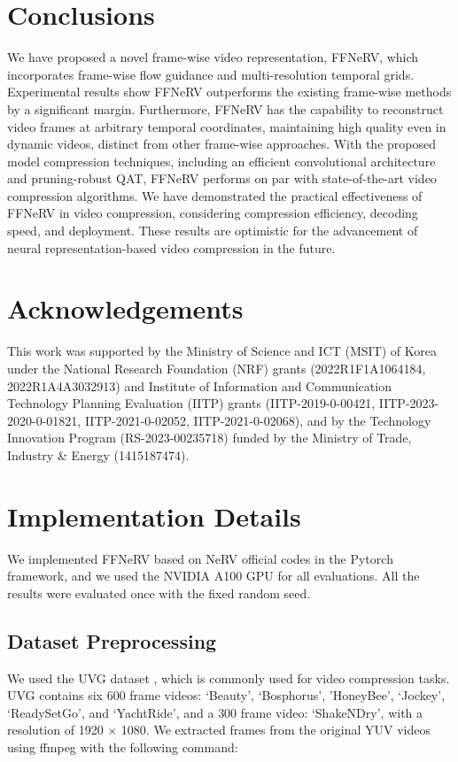 \documentclass[sigconf]{acmart}
\begin{document}
\section{Conclusions}
We have proposed a novel frame-wise video representation, FFNeRV, which incorporates frame-wise flow guidance and multi-resolution temporal grids.
Experimental results show FFNeRV outperforms the existing frame-wise methods by a significant margin.
Furthermore, FFNeRV has the capability to reconstruct video frames at arbitrary temporal coordinates, maintaining high quality even in dynamic videos, distinct from other frame-wise approaches.
With the proposed model compression techniques, including an efficient convolutional architecture and pruning-robust QAT, FFNeRV performs on par with state-of-the-art video compression algorithms.
We have demonstrated the practical effectiveness of FFNeRV in video compression, considering compression efficiency, decoding speed, and deployment.
These results are optimistic for the advancement of neural representation-based video compression in the future.

\section*{Acknowledgements}
This work was supported by the Ministry of Science and ICT (MSIT) of Korea under the National Research Foundation (NRF) grants (2022R1F1A1064184, 2022R1A4A3032913) and Institute of Information and Communication Technology Planning Evaluation (IITP) grants (IITP-2019-0-00421, IITP-2023-2020-0-01821, IITP-2021-0-02052, IITP-2021-0-02068), and by the Technology Innovation Program (RS-2023-00235718) funded by the Ministry of Trade, Industry \& Energy (1415187474).




\balance



\appendix

\section{Implementation Details}
\label{app_imp}
We implemented FFNeRV based on NeRV \cite{nerv} official codes in the Pytorch framework, and we used the NVIDIA A100 GPU for all evaluations.
All the results were evaluated once with the fixed random seed.

\subsection{Dataset Preprocessing}
We used the UVG dataset \cite{uvg}, which is commonly used for video compression tasks.
UVG contains six 600 frame videos: `Beauty', `Bosphorus', 'HoneyBee', `Jockey', `ReadySetGo', and `YachtRide', and a 300 frame video: `ShakeNDry', with a resolution of 1920 $\times$ 1080.
We extracted frames from the original YUV videos using ffmpeg \cite{ffmpeg} with the following command:
\end{document}
